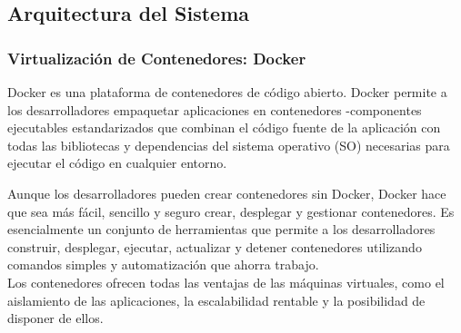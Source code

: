 \documentclass[../../main.tex]{subfiles}
\begin{document}
\subsection{Arquitectura del Sistema}
    
\begin{comment}
    \begin{itemize}
        \item R: Lenguaje de programación bajo el cual esta escrito el proyecto.
        \item RStudio: Entorno de desarollo de R
        \item Overleaf: Herramienta online para la escritura de la memoria.
        \item MariaDB: Servidor de base de datos.
        \item phpMyAdmin: Gestor de servidor de base de datos
        \item Docker: Gestor de maquinas virtuales
    \end{itemize}
    
    Se utilizará Docker como gestor de maquinas virtuales esta herramienta para descargar una maquina virtual de un servidor de base de datos MariaDB\cite{doc11} y un gestor de base de datos phpMyAdmin\cite{doc12} ya preconfigurada.\\
\end{comment}



\subsubsection{Virtualización de Contenedores: Docker}

Docker\cite{doc10} es una plataforma de contenedores de código abierto. Docker permite a los desarrolladores empaquetar aplicaciones en contenedores -componentes ejecutables estandarizados que combinan el código fuente de la aplicación con todas las bibliotecas y dependencias del sistema operativo (SO) necesarias para ejecutar el código en cualquier entorno.

Aunque los desarrolladores pueden crear contenedores sin Docker, Docker hace que sea más fácil, sencillo y seguro crear, desplegar y gestionar contenedores. Es esencialmente un conjunto de herramientas que permite a los desarrolladores construir, desplegar, ejecutar, actualizar y detener contenedores utilizando comandos simples y automatización que ahorra trabajo.\\

Los contenedores ofrecen todas las ventajas de las máquinas virtuales, como el aislamiento de las aplicaciones, la escalabilidad rentable y la posibilidad de disponer de ellos.
\end{document}

